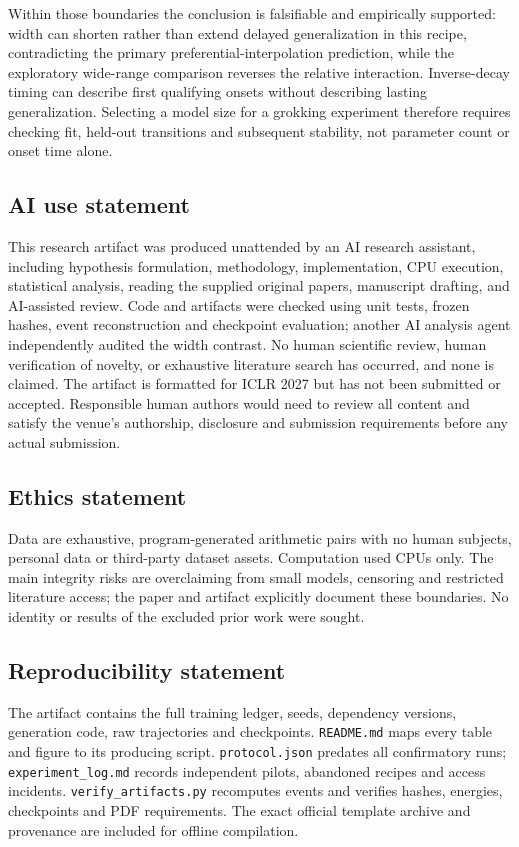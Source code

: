 \documentclass{article}
\begin{document}
Within those boundaries the conclusion is falsifiable and empirically supported: width can shorten rather than extend delayed generalization in this recipe, contradicting the primary preferential-interpolation prediction, while the exploratory wide-range comparison reverses the relative interaction. Inverse-decay timing can describe first qualifying onsets without describing lasting generalization. Selecting a model size for a grokking experiment therefore requires checking fit, held-out transitions and subsequent stability, not parameter count or onset time alone.\label{mainend}

\clearpage
\subsection*{AI use statement}
This research artifact was produced unattended by an AI research assistant, including hypothesis formulation, methodology, implementation, CPU execution, statistical analysis, reading the supplied original papers, manuscript drafting, and AI-assisted review. Code and artifacts were checked using unit tests, frozen hashes, event reconstruction and checkpoint evaluation; another AI analysis agent independently audited the width contrast. No human scientific review, human verification of novelty, or exhaustive literature search has occurred, and none is claimed. The artifact is formatted for ICLR 2027 but has not been submitted or accepted. Responsible human authors would need to review all content and satisfy the venue's authorship, disclosure and submission requirements before any actual submission.

\subsection*{Ethics statement}
Data are exhaustive, program-generated arithmetic pairs with no human subjects, personal data or third-party dataset assets. Computation used CPUs only. The main integrity risks are overclaiming from small models, censoring and restricted literature access; the paper and artifact explicitly document these boundaries. No identity or results of the excluded prior work were sought.

\subsection*{Reproducibility statement}
The artifact contains the full training ledger, seeds, dependency versions, generation code, raw trajectories and checkpoints. \texttt{README.md} maps every table and figure to its producing script. \texttt{protocol.json} predates all confirmatory runs; \texttt{experiment\_log.md} records independent pilots, abandoned recipes and access incidents. \texttt{verify\_artifacts.py} recomputes events and verifies hashes, energies, checkpoints and PDF requirements. The exact official template archive and provenance are included for offline compilation.
\end{document}
